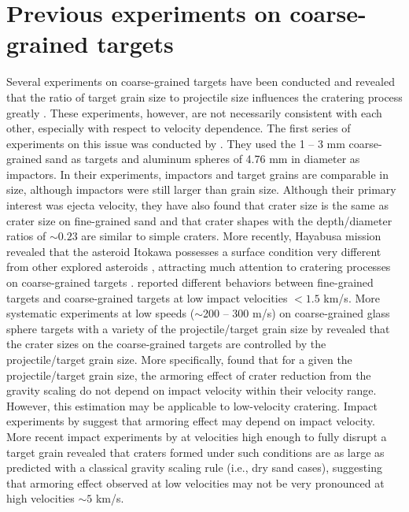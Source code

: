 \documentclass[3p,authoryear]{elsarticle}
\begin{document}
\section{Previous experiments on coarse-grained targets} \label{sec:review}
Several experiments on coarse-grained targets have been conducted and revealed that the ratio of target grain size to projectile size influences the cratering process greatly \citep{cintala1999, barnouin2005, guettler2012, holsapple2014}.
These experiments, however, are not necessarily consistent with each other, especially with respect to velocity dependence.
The first series of experiments on this issue was conducted by \citet{cintala1999}. They used the 1 -- 3 mm coarse-grained sand as targets and aluminum spheres of 4.76 mm in diameter as impactors. In their experiments, impactors and target grains are comparable in size, although impactors were still larger than grain size.
Although their primary interest was ejecta velocity, they have also found that crater size is the same as crater size on fine-grained sand and that crater shapes with the depth/diameter ratios of $\sim 0.23$ are similar to simple craters.
More recently, Hayabusa mission revealed that the asteroid Itokawa possesses a surface condition very different from other explored asteroids \citep[e.g.][]{fujiwara2006,saito2006}, attracting much attention to cratering processes on coarse-grained targets \citep{barnouin2011, guettler2012, holsapple2014}.
\citet{barnouin2011} reported different behaviors between fine-grained targets and coarse-grained targets at low impact velocities $<1.5$ km/s.
More systematic experiments at low speeds ($\sim$200 -- 300 m/s) on coarse-grained glass sphere targets with a variety of the projectile/target grain size by \citet{guettler2012} revealed that the crater sizes on the coarse-grained targets are controlled by the projectile/target grain size.
More specifically, \citet{guettler2012} found that for a given the projectile/target grain size, the armoring effect of crater reduction from the gravity scaling do not depend on impact velocity within their velocity range.
However, this estimation may be applicable to low-velocity cratering. Impact experiments by \citet{barnouin2011} suggest that armoring effect may depend on impact velocity.
More recent impact experiments by \citet{holsapple2014} at velocities high enough to fully disrupt a target grain revealed that craters formed under such conditions are as large as predicted with a classical gravity scaling rule (i.e., dry sand cases), suggesting that armoring effect observed at low velocities may not be very pronounced at high velocities $\sim 5$ km/s.
\end{document}
